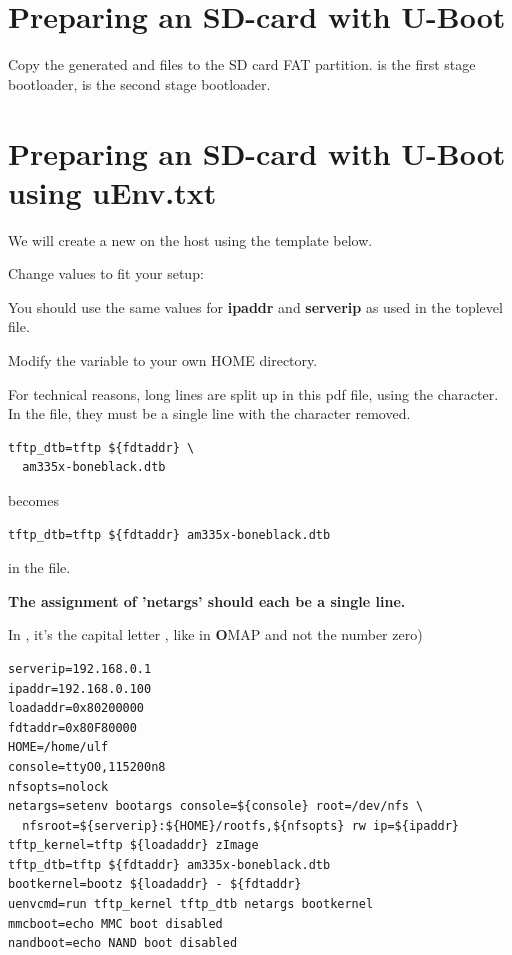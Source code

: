 \section{Preparing an SD-card with U-Boot}

Copy the generated  and  files
to the SD card FAT partition.  is the first stage bootloader,
 is the second stage bootloader.

\clearpage

\section{Preparing an SD-card with U-Boot using uEnv.txt}

We will create a new  on the host using the template below.

Change values to fit your setup:

You should use the same values for {\bf ipaddr} and {\bf serverip} as used in the toplevel  file.

Modify the  variable to your own HOME directory.

For technical reasons, long lines are split up in this pdf file, 
using the {\bf {}} character.
In the  file, they must be a single line with the {\bf {}} character removed.

\begin{verbatim}
tftp_dtb=tftp ${fdtaddr} \
  am335x-boneblack.dtb
\end{verbatim}

becomes

\begin{verbatim}
tftp_dtb=tftp ${fdtaddr} am335x-boneblack.dtb
\end{verbatim}

in the file.

{\bf The assignment of 'netargs' should each be a single line.}

In , it's the capital letter , like in {\bf O}MAP and not the number zero)

\begin{verbatim}
serverip=192.168.0.1
ipaddr=192.168.0.100
loadaddr=0x80200000
fdtaddr=0x80F80000
HOME=/home/ulf
console=ttyO0,115200n8
nfsopts=nolock
netargs=setenv bootargs console=${console} root=/dev/nfs \
  nfsroot=${serverip}:${HOME}/rootfs,${nfsopts} rw ip=${ipaddr}
tftp_kernel=tftp ${loadaddr} zImage
tftp_dtb=tftp ${fdtaddr} am335x-boneblack.dtb
bootkernel=bootz ${loadaddr} - ${fdtaddr}
uenvcmd=run tftp_kernel tftp_dtb netargs bootkernel
mmcboot=echo MMC boot disabled
nandboot=echo NAND boot disabled
\end{verbatim}

